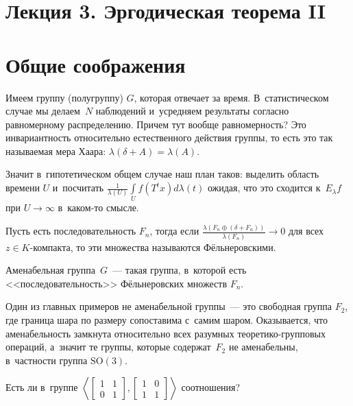 \documentclass{article}
\begin{document}
\section*{Лекция 3. Эргодическая теорема II}
\resetcntrs

\section{Общие соображения}

Имеем группу (полугруппу) $G$, которая отвечает за время. В~статистическом
случае мы делаем~$N$ наблюдений и~усредняем результаты согласно равномерному
распределению. Причем тут вообще равномерность? Это инвариантность относительно
естественного действия группы, то есть это так называемая мера Хаара:
$\lambda(\delta + A) = \lambda(A)$.

Значит в~гипотетическом общем случае наш план таков: выделить область времени
$U$ и~посчитать $\frac{1}{\lambda(U)} \int\limits_U f(T^t x) d\lambda(t)$
ожидая, что это сходится к~$E_\lambda f$ при $U \rightarrow \infty$ в~каком-то
смысле.

\begin{definition}
	Пусть есть последовательность $F_n$, тогда если $\frac{\lambda(F_n \oplus
	(\delta + F_n))}{\lambda(F_n)} \rightarrow 0$ для всех $z \in K$-компакта, то
	эти множества называются Фёльнеровскими.
\end{definition}

\begin{definition}
	Аменабельная группа~$G$~--- такая группа, в~которой есть
	<<последовательность>> Фёльнеровских множеств $F_n$.
\end{definition}

Один из главных примеров не аменабельной группы~--- это свободная группа $F_2$,
где граница шара по размеру сопоставима с~самим шаром. Оказывается, что
аменабельность замкнута относительно всех разумных теоретико-групповых операций,
а~значит те группы, которые содержат~$F_2$ не аменабельны, в~частности группа
$\text{SO}(3)$.

\begin{exercise}
	Есть ли в~группе $\left< \begin{bmatrix} 1 & 1 \\ 0 & 1\end{bmatrix},
		\begin{bmatrix} 1 & 0 \\ 1 & 1 \end{bmatrix} \right>$ соотношения?
\end{exercise}
\end{document}
